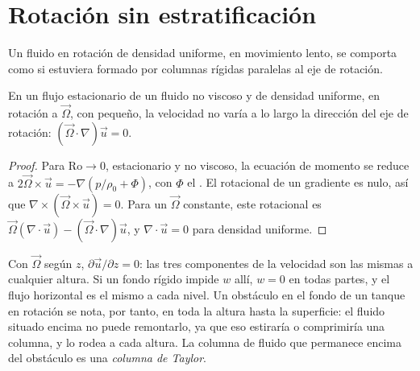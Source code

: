 \section{Rotación sin estratificación}\label{sec:b3:gfd-foundations:taylor}

Un fluido en rotación de densidad uniforme, en movimiento lento, se comporta como si estuviera
formado por columnas rígidas paralelas al eje de rotación.

\begin{theorem}\label{thm:b3:gfd-foundations:taylor-proudman}
En un flujo estacionario de un fluido no viscoso y de densidad uniforme, en rotación a
$\vec\Omega$, con  pequeño, la velocidad no varía a lo largo
la dirección del eje de rotación: $(\vec\Omega\cdot\nabla)\vec u = 0$.
\end{theorem}

\begin{proof}
Para $\mathrm{Ro}\to 0$, estacionario y no viscoso, la ecuación de momento se reduce
a $2\vec\Omega\times\vec u = -\nabla(p/\rho_0 + \Phi)$, con $\Phi$ el
. El rotacional de un gradiente es nulo, así que $\nabla\times(\vec\Omega
\times\vec u) = 0$. Para un $\vec\Omega$ constante, este rotacional es $\vec\Omega
(\nabla\cdot\vec u) - (\vec\Omega\cdot\nabla)\vec u$, y $\nabla\cdot\vec u
= 0$ para densidad uniforme.
\end{proof}

Con $\vec\Omega$ según $z$, $\partial\vec u/\partial z = 0$: las tres
componentes de la velocidad son las mismas a cualquier altura. Si un fondo rígido impide
$w$ allí, $w = 0$ en todas partes, y el flujo horizontal es el mismo a cada
nivel. Un obstáculo en el fondo de un tanque en rotación se nota, por tanto, en toda
la altura hasta la superficie: el fluido situado encima no puede remontarlo, ya que
eso estiraría o comprimiría una columna, y lo rodea a cada altura.
La columna de fluido que permanece encima del obstáculo es una \emph{columna de
Taylor}.

